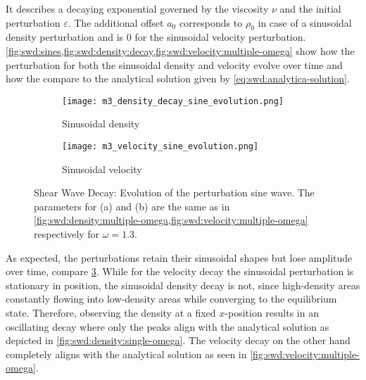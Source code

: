 It describes a decaying exponential governed by the viscosity $\nu$ and the initial perturbation $\varepsilon$. The additional offset $a_0$ corresponds to $\rho_0$ in case of a sinusoidal density perturbation and is $0$ for the sinusoidal velocity perturbation. \cref{fig:swd:sines,fig:swd:density:decay,fig:swd:velocity:multiple-omega} show how the perturbation for both the sinusoidal density and velocity evolve over time and how the compare to the analytical solution given by \cref{eq:swd:analytica-solution}.

\begin{figure}[ht!]
    \begin{subfigure}{0.514\linewidth}
        \centering
        \texttt{[image: m3\_density\_decay\_sine\_evolution.png]}
        \caption{Sinusoidal density}
        \label{fig:swd:density:sine}
    \end{subfigure}%
    \begin{subfigure}{0.486\linewidth}
        \centering
        \texttt{[image: m3\_velocity\_sine\_evolution.png]}
        \caption{Sinusoidal velocity}
        \label{fig:swd:velocity:sine}
    \end{subfigure}
    \caption[Shear Wave Decay: Evolution of the perturbation sine wave]{Shear Wave Decay: Evolution of the perturbation sine wave. The parameters for (a) and (b) are the same as in \cref{fig:swd:density:multiple-omega,fig:swd:velocity:multiple-omega} respectively for $\omega=1.3$.}
    \label{fig:swd:sines}
\end{figure}

As expected, the perturbations retain their sinusoidal shapes but lose amplitude over time, compare \cref{fig:swd:sines}. While for the velocity decay the sinusoidal perturbation is stationary in position, the sinusoidal density decay is not, since high-density areas constantly flowing into low-density areas while converging to the equilibrium state. Therefore, observing the density at a fixed $x$-position results in an oscillating decay where only the peaks align with the analytical solution as depicted in \cref{fig:swd:density:single-omega}. The velocity decay on the other hand completely aligns with the analytical solution as seen in \cref{fig:swd:velocity:multiple-omega}.

